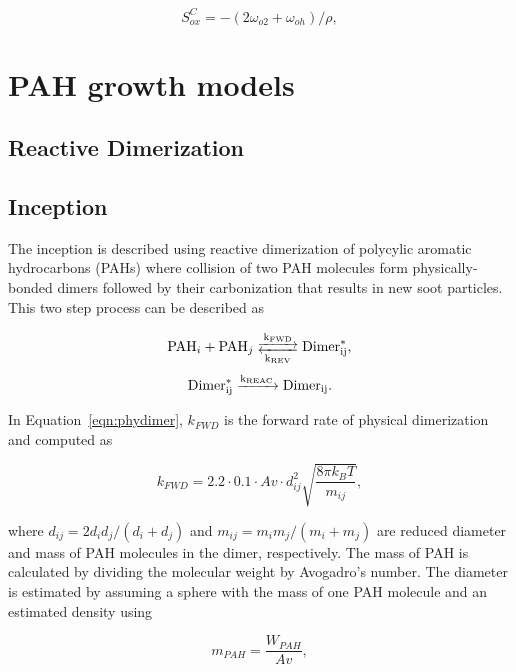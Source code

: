 \begin{equation}
	S^C_{ox} = -(2\omega_{o2}+\omega_{oh})/\rho
	\label{eqn:SCOx},
\end{equation}

\section{PAH growth models}
\subsection{Reactive Dimerization}

\subsection{Inception}

The inception is described using reactive dimerization of polycylic aromatic hydrocarbons (PAHs) \cite{kholghy2018reactive} where collision of two PAH molecules form physically-bonded dimers followed by their carbonization that results in new soot particles. This two step process can be described as

\begin{equation}
	\ce{PAH_i + PAH_j <-->[k_{FWD}][k_{REV}] Dimer^*_{ij} }
	\label{eqn:phydimer},
\end{equation}
\begin{equation}
	\ce{Dimer^*_{ij} ->[k_{REAC}] Dimer_{ij} }
	\label{eqn:chemdimer}.
\end{equation}

In Equation~\eqref{eqn:phydimer}, $k_{FWD}$ is the forward rate of physical dimerization and computed as

\begin{equation}
	k_{FWD} = 2.2 \cdot 0.1 \cdot Av\cdot d^2_{ij} \sqrt{\frac{8\pi k_B T}{m_{ij}}}
	\label{eqn:kFWD},
\end{equation}

\noindent where $d_{ij}=2d_id_j/(d_i+d_j)$ and $m_{ij}=m_im_j/(m_i+m_j)$ are reduced diameter and mass of PAH molecules in the dimer, respectively. The mass of PAH is calculated by dividing the molecular weight by Avogadro's number. The diameter is estimated by assuming a sphere with the mass of one PAH molecule and an estimated density \cite{johansson2017evolution} using 

\begin{equation}
	m_{PAH} = \frac{W_{PAH}}{Av}
	\label{eqn:PAHmass},
\end{equation}


